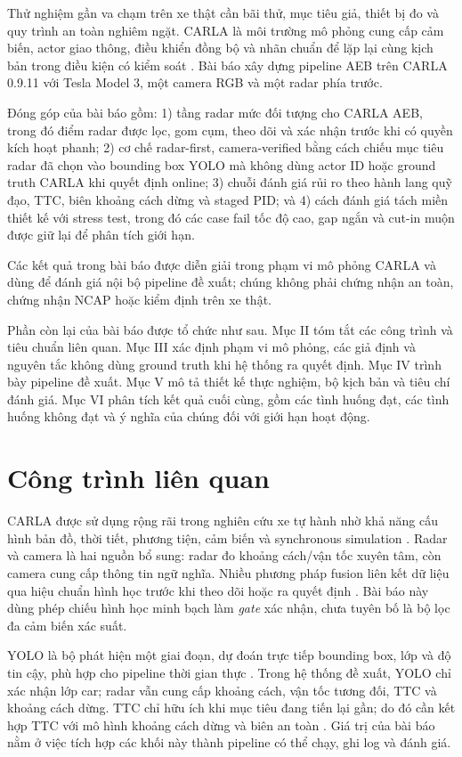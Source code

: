 \documentclass[conference]{IEEEtran}
\begin{document}
Thử nghiệm gần va chạm trên xe thật cần bãi thử, mục tiêu giả, thiết bị đo và quy trình an toàn nghiêm ngặt. CARLA là môi trường mô phỏng cung cấp cảm biến, actor giao thông, điều khiển đồng bộ và nhãn chuẩn để lặp lại cùng kịch bản trong điều kiện có kiểm soát \cite{dosovitskiy2017carla,carla_docs}. Bài báo xây dựng pipeline AEB trên CARLA 0.9.11 với Tesla Model 3, một camera RGB và một radar phía trước.

Đóng góp của bài báo gồm: 1) tầng radar mức đối tượng cho CARLA AEB, trong đó điểm radar được lọc, gom cụm, theo dõi và xác nhận trước khi có quyền kích hoạt phanh; 2) cơ chế radar-first, camera-verified bằng cách chiếu mục tiêu radar đã chọn vào bounding box YOLO mà không dùng actor ID hoặc ground truth CARLA khi quyết định online; 3) chuỗi đánh giá rủi ro theo hành lang quỹ đạo, TTC, biên khoảng cách dừng và staged PID; và 4) cách đánh giá tách miền thiết kế với stress test, trong đó các case fail tốc độ cao, gap ngắn và cut-in muộn được giữ lại để phân tích giới hạn.

Các kết quả trong bài báo được diễn giải trong phạm vi mô phỏng CARLA và dùng để đánh giá nội bộ pipeline đề xuất; chúng không phải chứng nhận an toàn, chứng nhận NCAP hoặc kiểm định trên xe thật.

Phần còn lại của bài báo được tổ chức như sau. Mục II tóm tắt các công trình và tiêu chuẩn liên quan. Mục III xác định phạm vi mô phỏng, các giả định và nguyên tắc không dùng ground truth khi hệ thống ra quyết định. Mục IV trình bày pipeline đề xuất. Mục V mô tả thiết kế thực nghiệm, bộ kịch bản và tiêu chí đánh giá. Mục VI phân tích kết quả cuối cùng, gồm các tình huống đạt, các tình huống không đạt và ý nghĩa của chúng đối với giới hạn hoạt động.

\section{Công trình liên quan}
CARLA được sử dụng rộng rãi trong nghiên cứu xe tự hành nhờ khả năng cấu hình bản đồ, thời tiết, phương tiện, cảm biến và synchronous simulation \cite{dosovitskiy2017carla,carla_sensors}. Radar và camera là hai nguồn bổ sung: radar đo khoảng cách/vận tốc xuyên tâm, còn camera cung cấp thông tin ngữ nghĩa. Nhiều phương pháp fusion liên kết dữ liệu qua hiệu chuẩn hình học trước khi theo dõi hoặc ra quyết định \cite{feng2021multimodal}. Bài báo này dùng phép chiếu hình học minh bạch làm \textit{gate} xác nhận, chưa tuyên bố là bộ lọc đa cảm biến xác suất.

YOLO là bộ phát hiện một giai đoạn, dự đoán trực tiếp bounding box, lớp và độ tin cậy, phù hợp cho pipeline thời gian thực \cite{ultralytics_yolo}. Trong hệ thống đề xuất, YOLO chỉ xác nhận lớp car; radar vẫn cung cấp khoảng cách, vận tốc tương đối, TTC và khoảng cách dừng. TTC chỉ hữu ích khi mục tiêu đang tiến lại gần; do đó cần kết hợp TTC với mô hình khoảng cách dừng và biên an toàn \cite{iso15623}. Giá trị của bài báo nằm ở việc tích hợp các khối này thành pipeline có thể chạy, ghi log và đánh giá.
\end{document}
